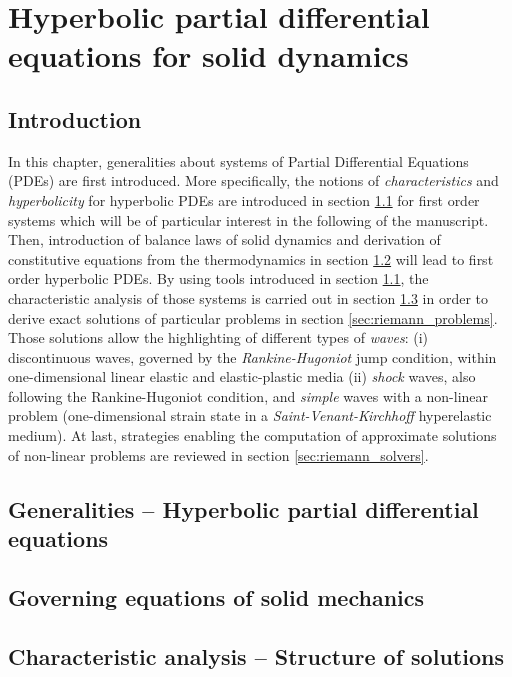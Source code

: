 \chapter{Hyperbolic partial differential equations for solid dynamics}
\section*{Introduction}
In this chapter, generalities about systems of Partial Differential Equations (PDEs) are first introduced. More specifically, the notions of \textit{characteristics} and \textit{hyperbolicity} for hyperbolic PDEs are introduced in section \ref{sec:PDEs} for first order systems which will be of particular interest in the following of the manuscript.
Then, introduction of balance laws of solid dynamics and derivation of constitutive equations from the thermodynamics in section \ref{sec:solidMech_equations} will lead to first order hyperbolic PDEs.
By using tools introduced in section \ref{sec:PDEs}, the characteristic analysis of those systems is carried out in section \ref{sec:characteristic_analysis} in order to derive exact solutions of particular problems in section \ref{sec:riemann_problems}. Those solutions allow the highlighting of different types of \textit{waves}: (i) discontinuous waves, governed by the \textit{Rankine-Hugoniot} jump condition, within one-dimensional linear elastic and elastic-plastic media (ii) \textit{shock} waves, also following the Rankine-Hugoniot condition, and \textit{simple} waves with a non-linear problem (one-dimensional strain state in a \textit{Saint-Venant-Kirchhoff} hyperelastic medium).
At last, strategies enabling the computation of approximate solutions of non-linear problems are reviewed in section \ref{sec:riemann_solvers}.


\section{Generalities -- Hyperbolic partial differential equations}
\label{sec:PDEs}


\section{Governing equations of solid mechanics}
\label{sec:solidMech_equations}



\section{Characteristic analysis -- Structure of solutions}
\label{sec:characteristic_analysis}


